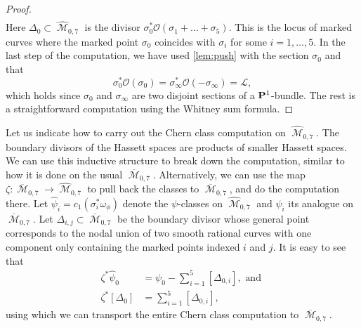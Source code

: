\documentclass[reqno]{amsart}
\DeclareMathOperator{\M}{\mathcal{M}}
\renewcommand{\to}{{\longrightarrow}}
\renewcommand {\P}{{\bf P}}
\numberwithin{equation}{section}
\renewcommand{\O}{\mathcal{O}}
\begin{document}
\begin{proof}
\begin{equation}
\begin{split}
    \end{split}
  \end{equation}
  Here $\Delta_0 \subset \widehat{\M}_{0,7}$ is the divisor $\sigma_0^* \O(\sigma_1 + \dots + \sigma_5)$.
  This is the locus of marked curves where the marked point $\sigma_0$ coincides with $\sigma_i$ for some $i = 1, \dots, 5$.
  In the last step of the computation, we have used \autoref{lem:push} with the section $\sigma_0$ and that
  \[ \sigma_0^* \O(\sigma_0) = \sigma_{\infty}^*\O(-\sigma_{\infty}) = \mathcal{L},\]
  which holds since $\sigma_0$ and $\sigma_{\infty}$ are two disjoint sections of a $\P^1$-bundle.
  The rest is a straightforward computation using the Whitney sum formula.
\end{proof}
Let us indicate how to carry out the Chern class computation on $\widehat{\M}_{0,7}$.
The boundary divisors of the Hassett spaces are products of smaller Hassett spaces.
We can use this inductive structure to break down the computation, similar to how it is done on the usual $\overline{\M}_{0,7}$.
Alternatively, we can use the map $\zeta \colon \overline{\M}_{0,7} \to \widehat{\M}_{0,7}$ to pull back the classes to $\overline{\M}_{0,7}$, and do the computation there.
Let $\widehat{\psi}_i = c_1(\sigma_i^* \omega_{\phi})$ denote the $\psi$-classes on $\widehat{\M}_{0,7}$ and $\psi_i$ its analogue on $\overline{\M}_{0,7}$.
Let $\Delta_{i,j} \subset \overline{\M}_{0,7}$ be the boundary divisor whose general point corresponds to the nodal union of two smooth rational curves with one component only containing the marked points indexed $i$ and $j$.
It is easy to see that
\begin{align*}
  \zeta^* \widehat{\psi}_0 &= \psi_0 - \sum_{i= 1}^5 [\Delta_{0,i}], \text{ and }\\
  \zeta^* [\Delta_{0}] &= \sum_{i= 1}^5 [\Delta_{0,i}],
\end{align*}
using which we can transport the entire Chern class computation to $\overline{\M}_{0,7}$.
\end{document}
